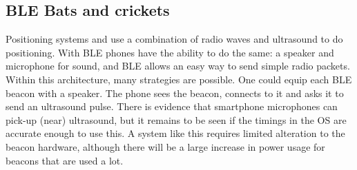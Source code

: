 \subsection{BLE Bats and crickets}
Positioning systems \citep{harter2002anatomy} and \citep{priyantha2000cricket} use a combination of radio waves and ultrasound to do positioning.
With BLE phones have the ability to do the same: a speaker and microphone for sound, and BLE allows \apps an easy way to send simple radio packets.
Within this architecture, many strategies are possible.
One could equip each BLE beacon with a speaker.
The phone sees the beacon, connects to it and asks it to send an ultrasound pulse.
There is evidence that smartphone microphones can pick-up (near) ultrasound\citep{arentz2011near,bihler2011smartguide}, but it remains to be seen if the timings in the OS are accurate enough to use this.
A system like this requires limited alteration to the beacon hardware, although there will be a large increase in power usage for beacons that are used a lot.
